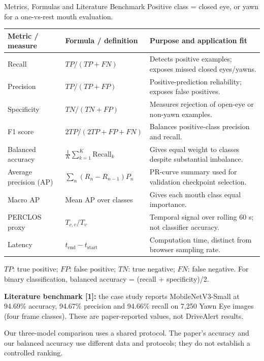 \documentclass[aspectratio=169,10pt]{beamer}
\renewcommand{\arraystretch}{1.22}
\newcommand{\smallnote}[1]{{\footnotesize\color{DarkSlate}#1\par}}
\begin{document}
\begin{frame}[t]{Metrics, Formulas and Literature Benchmark}
\fontsize{10}{11.5}\selectfont
\renewcommand{\arraystretch}{1.06}
\setlength{\tabcolsep}{4pt}
\setlength{\abovedisplayskip}{4pt}
\setlength{\belowdisplayskip}{4pt}
\fontsize{10}{11.5}\selectfont
\renewcommand{\arraystretch}{1.06}
\setlength{\tabcolsep}{3pt}
\setlength{\abovedisplayskip}{3pt}
\setlength{\belowdisplayskip}{3pt}
Positive class = closed eye, or yawn for a one-vs-rest mouth evaluation.
\par\vspace{1pt}
\begin{tabularx}{\textwidth}{L{3.1cm} L{3.4cm} Y}
\toprule
\textbf{Metric / measure} & \textbf{Formula / definition} & \textbf{Purpose and application fit}\\\midrule

Recall & $TP/(TP+FN)$ & Detects positive examples; exposes missed closed eyes/yawns.\\
Precision & $TP/(TP+FP)$ & Positive-prediction reliability; exposes false positives.\\
Specificity & $TN/(TN+FP)$ & Measures rejection of open-eye or non-yawn examples.\\
F1 score & $2TP/(2TP+FP+FN)$ & Balances positive-class precision and recall.\\
Balanced accuracy & $\frac{1}{K}\sum_{k=1}^{K}\mathrm{Recall}_k$ & Gives equal weight to classes despite substantial imbalance.\\
Average precision (AP) & $\sum_n (R_n-R_{n-1})P_n$ & PR-curve summary used for validation checkpoint selection.\\
Macro AP & Mean AP over classes & Gives each mouth class equal importance.\\
PERCLOS proxy & $T_{c,v}/T_v$ & Temporal signal over rolling 60 s; not classifier accuracy.\\
Latency & $t_{\mathrm{end}}-t_{\mathrm{start}}$ & Computation time, distinct from browser sampling rate.\\\bottomrule\end{tabularx}
\par\vspace{1pt}
\smallnote{$TP$: true positive; $FP$: false positive; $TN$: true negative; $FN$: false negative. For binary classification, balanced accuracy = (recall + specificity)/2.}
\par\vspace{1pt}
\textbf{Literature benchmark [1]:} the case study reports MobileNetV3-Small at 94.69\% accuracy, 94.67\% precision and 94.66\% recall on 7,250 Yawn Eye images (four frame classes). These are paper-reported values, not DriveAlert results.
\par\vspace{1pt}
\smallnote{Our three-model comparison uses a shared protocol. The paper's accuracy and our balanced accuracy use different data and protocols; they do not establish a controlled ranking.}


\end{frame}
\end{document}
